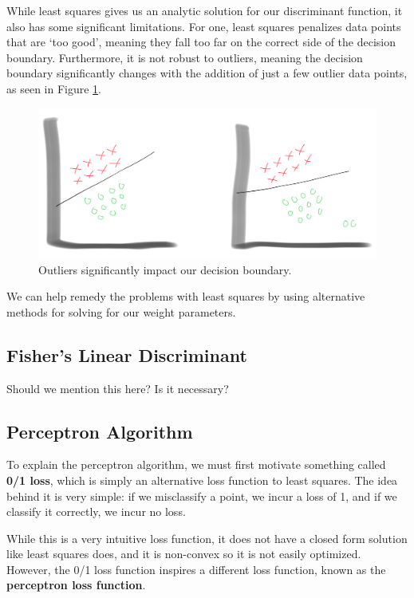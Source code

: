 While least squares gives us an analytic solution for our discriminant function, it also has some significant limitations. For one, least squares penalizes data points that are `too good', meaning they fall too far on the correct side of the decision boundary. Furthermore, it is not robust to outliers, meaning the decision boundary significantly changes with the addition of just a few outlier data points, as seen in Figure \ref{fig:outlier-phenomenon}.

\begin{figure}
    \centering
    \includegraphics[width=0.5\paperwidth]{../Classification/fig/outlier_phenomenon_ipad.jpg}
    \caption{Outliers significantly impact our decision boundary.}
    \label{fig:outlier-phenomenon}
\end{figure}

We can help remedy the problems with least squares by using alternative methods for solving for our weight parameters.

\subsection{Fisher's Linear Discriminant}
Should we mention this here? Is it necessary?

\subsection{Perceptron Algorithm}
To explain the perceptron algorithm, we must first motivate something called \textbf{0/1 loss}, which is simply an alternative loss function to least squares. The idea behind it is very simple: if we misclassify a point, we incur a loss of 1, and if we classify it correctly, we incur no loss.

While this is a very intuitive loss function, it does not have a closed form solution like least squares does, and it is non-convex so it is not easily optimized. However, the 0/1 loss function inspires a different loss function, known as the \textbf{perceptron loss function}.

